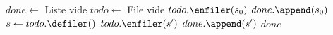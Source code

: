 


\begin{algorithm}[H]
\caption{$\algo{BFS}( G=(S, \Succ), s_0 )$}
\begin{algorithmic}[1]
\State $done \gets $ Liste vide
\State $todo\gets $ File vide
\State $todo.\enfiler(s_0)$
\State $done.\append(s_0)$
	\State $s\gets todo.\defiler()$
			\State $todo.\enfiler(s')$
			\State $done.\append(s')$
		\EndIf
	\EndFor
\EndWhile
\State\Return $done$
\end{algorithmic}
\end{algorithm}

